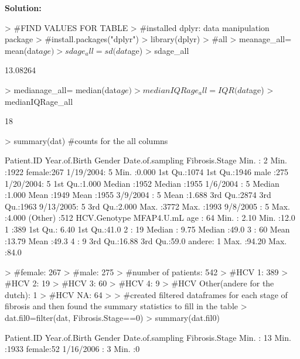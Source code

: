\documentclass{article}
\begin{document}
\textbf{Solution:}
\begin{Schunk}
\begin{Sinput}
> #FIND VALUES FOR TABLE
> #installed dplyr: data manipulation package
> #install.packages("dplyr")
> library(dplyr)
> #all
> meanage_all= mean(dat$age)
> sdage_all= sd(dat$age)
> sdage_all
\end{Sinput}
\begin{Soutput}
[1] 13.08264
\end{Soutput}
\begin{Sinput}
> medianage_all= median(dat$age)
> medianIQRage_all= IQR(dat$age)
> medianIQRage_all
\end{Sinput}
\begin{Soutput}
[1] 18
\end{Soutput}
\begin{Sinput}
> summary(dat) #counts for the all columns 
\end{Sinput}
\begin{Soutput}
   Patient.ID   Year.of.Birth     Gender     Date.of.sampling Fibrosis.Stage 
 Min.   :   2   Min.   :1922   female:267   1/19/2004:  5     Min.   :0.000  
 1st Qu.:1074   1st Qu.:1946   male  :275   1/20/2004:  5     1st Qu.:1.000  
 Median :1952   Median :1955                1/6/2004 :  5     Median :1.000  
 Mean   :1949   Mean   :1955                3/9/2004 :  5     Mean   :1.688  
 3rd Qu.:2874   3rd Qu.:1963                9/13/2005:  5     3rd Qu.:2.000  
 Max.   :3772   Max.   :1993                9/8/2005 :  5     Max.   :4.000  
                                            (Other)  :512                    
 HCV.Genotype   MFAP4.U.mL         age      
       : 64   Min.   : 2.10   Min.   :12.0  
 1     :389   1st Qu.: 6.40   1st Qu.:41.0  
 2     : 19   Median : 9.75   Median :49.0  
 3     : 60   Mean   :13.79   Mean   :49.3  
 4     :  9   3rd Qu.:16.88   3rd Qu.:59.0  
 andere:  1   Max.   :94.20   Max.   :84.0  
\end{Soutput}
\begin{Sinput}
> #female: 267
> #male: 275
> #number of patients: 542
> #HCV 1: 389
> #HCV 2: 19
> #HCV 3: 60
> #HCV 4: 9
> #HCV Other(andere for the dutch): 1
> #HCV NA: 64
> 
> #created filtered dataframes for each stage of fibrosis and then found the summary statistics to fill in the table
> dat.fil0=filter(dat, Fibrosis.Stage==0) 
> summary(dat.fil0)
\end{Sinput}
\begin{Soutput}
   Patient.ID   Year.of.Birth     Gender     Date.of.sampling Fibrosis.Stage
 Min.   :  13   Min.   :1933   female:52   1/16/2006 : 3      Min.   :0     

\end{Soutput}
\end{Schunk}
\end{document}
